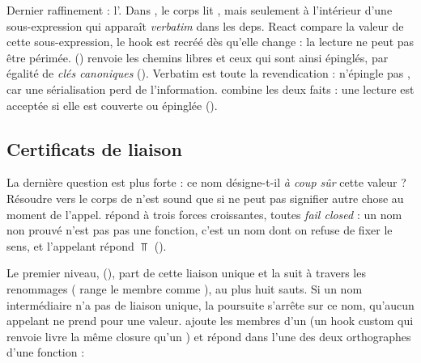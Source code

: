 Dernier raffinement : l'. Dans , le corps lit , mais seulement à l'intérieur d'une sous-expression qui apparaît \emph{verbatim} dans les deps. React compare la valeur de cette sous-expression, le hook est recréé dès qu'elle change : la lecture ne peut pas être périmée.  () renvoie les chemins libres et ceux qui sont ainsi épinglés, par égalité de \emph{clés canoniques} (). \og Verbatim est toute la revendication\fg{} :  n'épingle pas , car une sérialisation perd de l'information.  combine les deux faits : une lecture est acceptée si elle est couverte ou épinglée ().

\subsection{Certificats de liaison}

La dernière question est plus forte : ce nom désigne-t-il \emph{à coup sûr} cette valeur ? Résoudre  vers le corps de  n'est sound que si  ne peut pas signifier autre chose au moment de l'appel.  répond à trois forces croissantes, toutes \emph{fail closed} : un nom non prouvé n'est pas \og pas une fonction\fg{}, c'est un nom dont on refuse de fixer le sens, et l'appelant répond $\Top$ ().


Le premier niveau,  (), part de cette liaison unique et la suit à travers les renommages ( range le membre comme ), au plus huit sauts. Si un nom intermédiaire n'a pas de liaison unique, la poursuite s'arrête sur ce nom, \og qu'aucun appelant ne prend pour une valeur\fg{}.  ajoute les membres d'un  (un hook custom qui renvoie  livre la même closure qu'un ) et répond dans l'une des deux orthographes d'une fonction :


